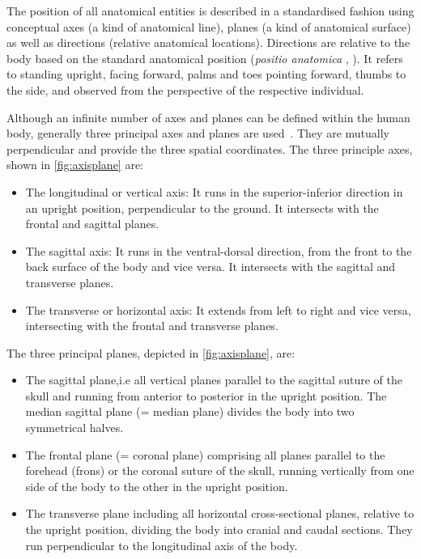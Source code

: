 \documentclass[sw]{iosart2x}
\begin{document}
The position of all anatomical entities is described in a standardised fashion using conceptual axes (a kind of anatomical line), planes (a kind of anatomical surface) as well as directions (relative anatomical locations).
Directions are relative to the body based on the standard anatomical position (\emph{positio anatomica} , ).
It refers to standing upright, facing forward, palms and toes pointing forward, thumbs to the side, and observed from the perspective of the respective individual. %

Although an infinite number of axes and planes can be defined within the human body, generally three principal axes and planes are used~\citep{prometheus}.
They are mutually perpendicular and provide the three spatial coordinates.
The three principle axes, shown in \cref{fig:axisplane} are:
\begin{itemize}
\item The longitudinal or vertical axis: It runs in the superior-inferior direction in an upright position, perpendicular to the ground.
It intersects with the frontal and sagittal planes.
\item The sagittal axis: It runs in the ventral-dorsal direction, from the front to the back surface of the body and vice versa.
It intersects with the sagittal and transverse planes.
\item The transverse or horizontal axis: It extends from left to right and vice versa, intersecting with the frontal and transverse planes.
\end{itemize}

The three principal planes, depicted in \cref{fig:axisplane}, are:
\begin{itemize}
\item The sagittal plane,i.e all vertical planes parallel to the sagittal suture of the skull and running from anterior to posterior in the upright position.
The median sagittal plane (= median plane) divides the body into two symmetrical halves.
\item The frontal plane (= coronal plane) comprising all planes parallel to the forehead (frons) or the coronal suture of the skull, running vertically from one side of the body to the other in the upright position.
\item The transverse plane including all horizontal cross-sectional planes, relative to the upright position, dividing the body into cranial and caudal sections.
They run perpendicular to the longitudinal axis of the body.
\end{itemize}
\end{document}
